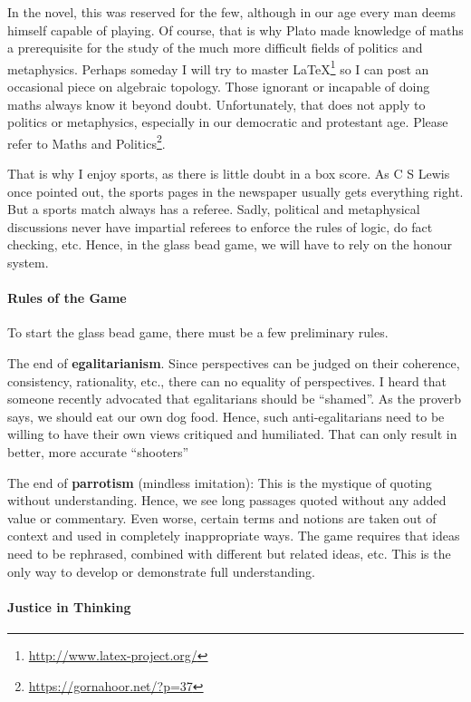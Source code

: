In the novel, this was reserved for the few, although in our age every man deems himself capable of playing. Of course, that is why Plato made knowledge of maths a prerequisite for the study of the much more difficult fields of politics and metaphysics. Perhaps someday I will try to master LaTeX\footnote{\url{http://www.latex-project.org/}} so I can post an occasional piece on algebraic topology. Those ignorant or incapable of doing maths always know it beyond doubt. Unfortunately, that does not apply to politics or metaphysics, especially in our democratic and protestant age. Please refer to Maths and Politics\footnote{\url{https://gornahoor.net/?p=37}}.

That is why I enjoy sports, as there is little doubt in a box score. As C S Lewis once pointed out, the sports pages in the newspaper usually gets everything right. But a sports match always has a referee. Sadly, political and metaphysical discussions never have impartial referees to enforce the rules of logic, do fact checking, etc. Hence, in the glass bead game, we will have to rely on the honour system.

\paragraph{Rules of the Game}


To start the glass bead game, there must be a few preliminary rules.

The end of \textbf{egalitarianism}. Since perspectives can be judged on their coherence, consistency, rationality, etc., there can no equality of perspectives. I heard that someone recently advocated that egalitarians should be ``shamed''. As the proverb says, we should eat our own dog food. Hence, such anti-egalitarians need to be willing to have their own views critiqued and humiliated. That can only result in better, more accurate ``shooters''

The end of \textbf{parrotism} (mindless imitation): This is the mystique of quoting without understanding. Hence, we see long passages quoted without any added value or commentary. Even worse, certain terms and notions are taken out of context and used in completely inappropriate ways. The game requires that ideas need to be rephrased, combined with different but related ideas, etc. This is the only way to develop or demonstrate full understanding.

\paragraph{Justice in Thinking}



